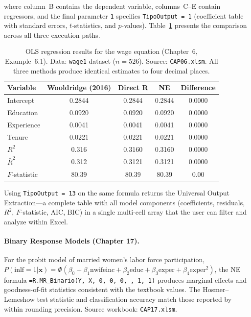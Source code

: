 \documentclass[preprint,12pt,authoryear]{elsarticle}
\newcommand{\neven}{NE\raisebox{0.2ex}{v}\rotatebox[origin=c]{180}{E}\rotatebox[origin=c]{180}{N}}
\begin{document}
where column~B contains the dependent variable, columns~C--E contain regressors, and the final parameter \texttt{1} specifies \texttt{TipoOutput = 1} (coefficient table with standard errors, $t$-statistics, and $p$-values). Table~\ref{tab:ols_results} presents the comparison across all three execution paths.

\begin{table}[htbp]
\centering
\caption{OLS regression results for the wage equation (Chapter~6, Example~6.1). Data: \texttt{wage1} dataset ($n = 526$). Source: \texttt{CAP06.xlsm}. All three methods produce identical estimates to four decimal places.}
\label{tab:ols_results}
\begin{tabular}{@{}lcccc@{}}
\toprule
\textbf{Variable} & \textbf{Wooldridge (2016)} & \textbf{Direct R} & \textbf{\neven{}} & \textbf{Difference} \\
\midrule
Intercept       & 0.2844  & 0.2844  & 0.2844  & 0.0000 \\
Education       & 0.0920  & 0.0920  & 0.0920  & 0.0000 \\
Experience      & 0.0041  & 0.0041  & 0.0041  & 0.0000 \\
Tenure          & 0.0221  & 0.0221  & 0.0221  & 0.0000 \\
\addlinespace
$R^2$           & 0.316   & 0.3160  & 0.3160  & 0.0000 \\
$\bar{R}^2$     & 0.312   & 0.3121  & 0.3121  & 0.0000 \\
$F$-statistic   & 80.39   & 80.39   & 80.39   & 0.00   \\
\bottomrule
\end{tabular}
\end{table}

Using \texttt{TipoOutput = 13} on the same formula returns the Universal Output Extraction---a complete table with all model components (coefficients, residuals, $R^2$, $F$-statistic, AIC, BIC) in a single multi-cell array that the user can filter and analyze within Excel.

\paragraph{Binary Response Models (Chapter 17).}
For the probit model of married women's labor force participation, $P(\text{inlf} = 1 | \mathbf{x}) = \Phi(\beta_0 + \beta_1 \text{nwifeinc} + \beta_2 \text{educ} + \beta_3 \text{exper} + \beta_4 \text{exper}^2)$, the \neven{} formula \texttt{=R.MR\_Binario(Y, X, 0, 0, 0, , 1, 1)} produces marginal effects and goodness-of-fit statistics consistent with the textbook values. The Hosmer--Lemeshow test statistic and classification accuracy match those reported by \citet{Wooldridge2016} within rounding precision. Source workbook: \texttt{CAP17.xlsm}.
\end{document}
